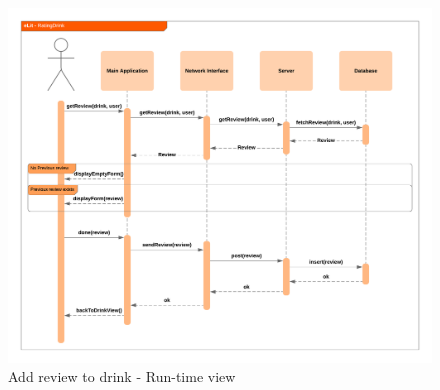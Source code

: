 \documentclass[paper=a4, fontsize=12pt]{scrartcl}
\numberwithin{equation}{section}		%
\numberwithin{figure}{section}			%
\numberwithin{table}{section}				%
\begin{document}
\begin{figure}[H]
\begin{center}
    \includegraphics[width=\textwidth]{RunTime/addDrinkReview.png}
    \caption{Add review to drink - Run-time view}
    \label{Add drink rt}
\end{center}
\end{figure}

\newpage
\end{document}

